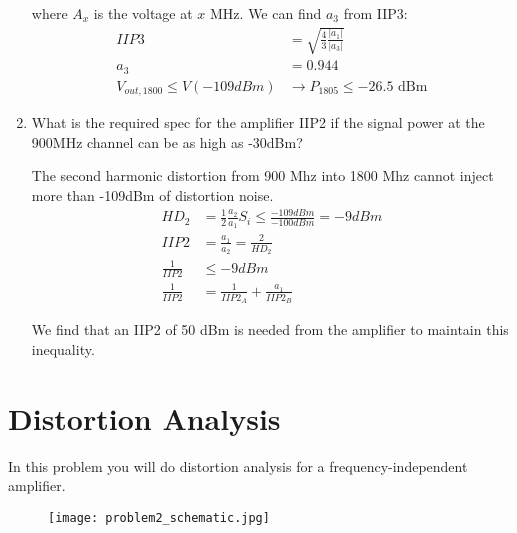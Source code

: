 \begin{enumerate}[label=(\alph*)]
    where $A_{x}$ is the voltage at $x$ MHz. We can find $a_3$ from IIP3:
    \begin{align*}
        IIP3 &= \sqrt{\frac{4}{3} \frac{|a_1|}{|a_3|}} \\
        a_3 &= 0.944 \\
        V_{out,1800} \leq V(-109 dBm) &\rightarrow P_{1805} \leq -26.5 \text{ dBm}
    \end{align*}

    \item {\color{blue}What is the required spec for the amplifier IIP2 if the signal power at the 900MHz channel can be as high as -30dBm?}

    The second harmonic distortion from 900 Mhz into 1800 Mhz cannot inject more than -109dBm of distortion noise.
    \begin{align*}
        HD_2 &= \frac{1}{2} \frac{a_2}{a_1} S_i \leq \frac{-109 dBm}{-100 dBm} = -9 dBm \\
        IIP2 &= \frac{a_1}{a_2} = \frac{2}{HD_2} \\
        \frac{1}{IIP2} &\leq -9 dBm \\
        \frac{1}{IIP2} &= \frac{1}{IIP2_A} + \frac{a_1}{IIP2_B}
    \end{align*}

    We find that an IIP2 of 50 dBm is needed from the amplifier to maintain this inequality.
\end{enumerate}

\section{Distortion Analysis}
{\color{blue} In this problem you will do distortion analysis for a frequency-independent amplifier.}
\begin{figure}[H]
    \centering \texttt{[image: problem2\_schematic.jpg]}
\end{figure}

